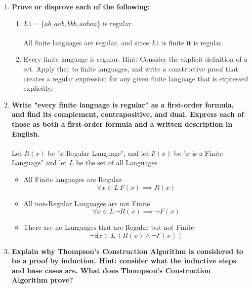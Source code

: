 \begin{enumerate}

\newpage
\item \textbf{Prove or disprove each of the following:}

\begin{enumerate}
    \item $L1 = \{ab, aab, bbb, aabaa\}$ is regular.
    \\\\ All finite languages are regular, and since $L1$ is finite it is regular.
    \\
    \item Every finite language is regular. Hint: Consider the explicit definition of a set. Apply that to finite languages, and write a constructive proof that creates a regular expression for any given finite language that is expressed explicitly.

\end{enumerate}

\newpage
\item \textbf{Write "every finite language is regular" as a first-order formula, and find its complement, contrapositive, and dual. Express each of those as both a first-order formula and a written description in English.}
\\\\Let $R(x)$ be "$x$ Regular Language", and let $F(x)$ be "$x$ is a Finite Language" and let $L$ be the set of all Languages
\begin{itemize}
	\item All Finite languages are Regular
		$$\forall x \in L \, F(x) \implies R(x)$$
	\item All non-Regular Languages are not Finite
		$$\forall x \in L \, \neg R(x) \implies \neg F(x)$$
	\item There are no Languages that are Regular but not Finite
		$$\neg \exists x \in L  \, ( R(x) \wedge \neg F(x) )$$
		
\end{itemize}


\newpage
\item \textbf{Explain why Thompson's Construction Algorithm is considered to be a proof by induction. Hint: consider what the inductive steps and base cases are. What does Thompson's Construction Algorithm prove?}



\end{enumerate}
